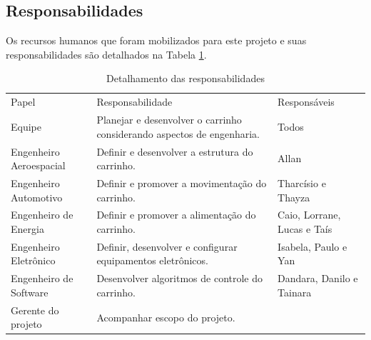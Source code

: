 \newpage

\subsection{Responsabilidades}
Os recursos humanos que foram mobilizados para este projeto e suas responsabilidades são detalhados na Tabela \ref{tab:responsabilidades}.


\begin{table}[h]
\caption {Detalhamento das responsabilidades} \label{tab:responsabilidades} 
 \centering
 {\renewcommand\arraystretch{1.25}
 \begin{tabular}{ l l l }
  \cline{1-1}\cline{2-2}\cline{3-3}  
    \multicolumn{1}{|p{2.567cm}|}{Papel} &
    \multicolumn{1}{p{6.433cm}|}{Responsabilidade} &
    \multicolumn{1}{p{2.417cm}|}{Responsáveis}
  \\  
  \cline{1-1}\cline{2-2}\cline{3-3}  
    \multicolumn{1}{|p{2.567cm}|}{Equipe} &
    \multicolumn{1}{p{6.433cm}|}{Planejar e desenvolver o carrinho considerando aspectos de engenharia.} &
    \multicolumn{1}{p{2.417cm}|}{Todos}
  \\  
  \cline{1-1}\cline{2-2}\cline{3-3}  
    \multicolumn{1}{|p{2.567cm}|}{Engenheiro Aeroespacial} &
    \multicolumn{1}{p{6.433cm}|}{Definir e desenvolver a estrutura do carrinho.} &
    \multicolumn{1}{p{2.417cm}|}{Allan}
  \\  
  \cline{1-1}\cline{2-2}\cline{3-3}  
    \multicolumn{1}{|p{2.567cm}|}{Engenheiro Automotivo} &
    \multicolumn{1}{p{6.433cm}|}{Definir e promover a movimentação do carrinho.} &
    \multicolumn{1}{p{2.417cm}|}{Tharcísio e Thayza}
  \\  
  \cline{1-1}\cline{2-2}\cline{3-3}  
    \multicolumn{1}{|p{2.567cm}|}{Engenheiro de Energia} &
    \multicolumn{1}{p{6.433cm}|}{Definir e promover a alimentação do carrinho.} &
    \multicolumn{1}{p{2.417cm}|}{Caio, Lorrane, Lucas e Taís}
  \\  
  \cline{1-1}\cline{2-2}\cline{3-3}  
    \multicolumn{1}{|p{2.567cm}|}{Engenheiro Eletrônico} &
    \multicolumn{1}{p{6.433cm}|}{Definir, desenvolver e configurar equipamentos eletrônicos.} &
    \multicolumn{1}{p{2.417cm}|}{Isabela, Paulo e Yan}
  \\  
  \cline{1-1}\cline{2-2}\cline{3-3}  
    \multicolumn{1}{|p{2.567cm}|}{Engenheiro de Software} &
    \multicolumn{1}{p{6.433cm}|}{Desenvolver algoritmos de controle do carrinho.} &
    \multicolumn{1}{p{2.417cm}|}{Dandara, Danilo e Tainara}
  \\  
  \cline{1-1}\cline{2-2}\cline{3-3}  
    \multicolumn{1}{|p{2.567cm}|}{Gerente do projeto} &
    \multicolumn{1}{p{6.433cm}|}{Acompanhar escopo do projeto.  			

}
\end{tabular}}
\end{table}
